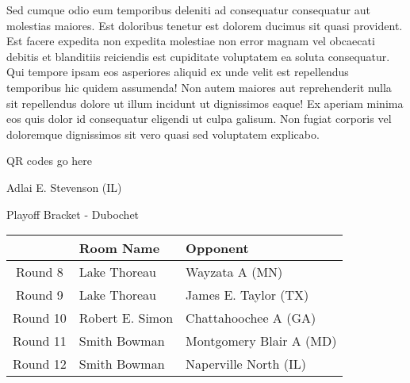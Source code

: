 \documentclass{article}%
\begin{document}
\newline%
Sed cumque odio eum temporibus deleniti ad consequatur consequatur aut molestias maiores. Est doloribus tenetur est dolorem ducimus sit quasi provident. Est facere expedita non expedita molestiae non error magnam vel obcaecati debitis et blanditiis reiciendis est cupiditate voluptatem ea soluta consequatur. Qui tempore ipsam eos asperiores aliquid ex unde velit est repellendus temporibus hic quidem assumenda!\newline%
\newline%
Non autem maiores aut reprehenderit nulla sit repellendus dolore ut illum incidunt ut dignissimos eaque! Ex aperiam minima eos quis dolor id consequatur eligendi ut culpa galisum. Non fugiat corporis vel doloremque dignissimos sit vero quasi sed voluptatem explicabo.\newline%
\newline%
%
\vspace*{30pt}%
\begin{center}%
\begin{Huge}%
QR codes go here%
\end{Huge}%
\end{center}%
\newpage%
\begin{center}%
\begin{Huge}%
Adlai E. Stevenson (IL)%
\end{Huge}%
\vspace*{8pt}%
\linebreak%
\begin{Large}%
Playoff Bracket {-} Dubochet%
\end{Large}%
\end{center}%
%
\begin{tabularx}{\textwidth}{|c|Y|Y|}%
\hline%
&Room Name&Opponent\\%
\hline%
Round 8&Lake Thoreau&Wayzata A (MN)\\%
Round 9&Lake Thoreau&James E. Taylor (TX)\\%
Round 10&Robert E. Simon&Chattahoochee A (GA)\\%
Round 11&Smith Bowman&Montgomery Blair A (MD)\\%
Round 12&Smith Bowman&Naperville North (IL)\\%
\hline%
\end{tabularx}%
\vspace*{8pt}%
\linebreak%
\newline%
\newline%
\end{document}
